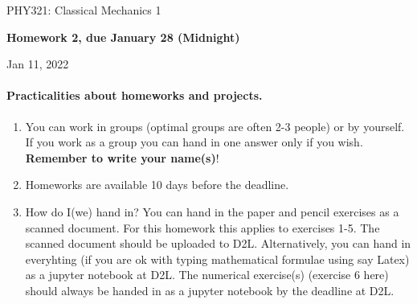 \documentclass[%
oneside,                 %
final,                   %
10pt]{article}
\begin{document}

\newcommand{\exercisesection}[1]{\subsection*{#1}}






\thispagestyle{empty}

\begin{center}
{\LARGE\bf
\begin{spacing}{1.25}
PHY321: Classical Mechanics 1
\end{spacing}
}
\end{center}


\begin{center}
{\bf Homework 2, due January 28 (Midnight)${}^{}$} \\ [0mm]
\end{center}

\begin{center}
\end{center}
    

\begin{center}
Jan 11, 2022
\end{center}

\vspace{1cm}


\paragraph{Practicalities about  homeworks and projects.}
\begin{enumerate}
\item You can work in groups (optimal groups are often 2-3 people) or by yourself. If you work as a group you can hand in one answer only if you wish. \textbf{Remember to write your name(s)}!

\item Homeworks are available 10 days  before the deadline.

\item How do I(we)  hand in?  You can hand in the paper and pencil exercises as a  scanned  document. For this homework this applies to exercises 1-5. The scanned document should be uploaded to D2L. Alternatively, you can hand in everyhting (if you are ok with typing mathematical formulae using say Latex) as a jupyter notebook at D2L. The numerical exercise(s) (exercise 6 here) should always be handed in as a jupyter notebook by the deadline at D2L. 
\end{enumerate}
\end{document}
